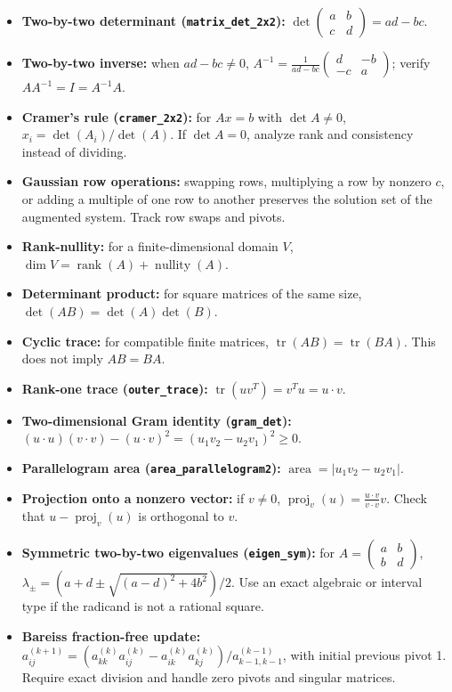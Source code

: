 \documentclass[
  10pt,
]{article}
\providecommand{\tightlist}{%
  \setlength{\itemsep}{0pt}\setlength{\parskip}{0pt}}
\begin{document}
\begin{itemize}
\tightlist
\item
  \textbf{Two-by-two determinant (\texttt{matrix\_det\_2x2}):}
  \(\det\begin{pmatrix}a&b\\c&d\end{pmatrix}=ad-bc\).
\item
  \textbf{Two-by-two inverse:} when \(ad-bc\ne0\),
  \(A^{-1}=\frac1{ad-bc}\begin{pmatrix}d&-b\\-c&a\end{pmatrix}\); verify
  \(AA^{-1}=I=A^{-1}A\).
\item
  \textbf{Cramer's rule (\texttt{cramer\_2x2}):} for \(Ax=b\) with
  \(\det A\ne0\), \(x_i=\det(A_i)/\det(A)\). If \(\det A=0\), analyze
  rank and consistency instead of dividing.
\item
  \textbf{Gaussian row operations:} swapping rows, multiplying a row by
  nonzero \(c\), or adding a multiple of one row to another preserves
  the solution set of the augmented system. Track row swaps and pivots.
\item
  \textbf{Rank-nullity:} for a finite-dimensional domain \(V\),
  \(\dim V=\operatorname{rank}(A)+\operatorname{nullity}(A)\).
\item
  \textbf{Determinant product:} for square matrices of the same size,
  \(\det(AB)=\det(A)\det(B)\).
\item
  \textbf{Cyclic trace:} for compatible finite matrices,
  \(\operatorname{tr}(AB)=\operatorname{tr}(BA)\). This does not imply
  \(AB=BA\).
\item
  \textbf{Rank-one trace (\texttt{outer\_trace}):}
  \(\operatorname{tr}(uv^T)=v^Tu=u\cdot v\).
\item
  \textbf{Two-dimensional Gram identity (\texttt{gram\_det}):}
  \((u\cdot u)(v\cdot v)-(u\cdot v)^2=(u_1v_2-u_2v_1)^2\ge0\).
\item
  \textbf{Parallelogram area (\texttt{area\_parallelogram2}):}
  \(\operatorname{area}=|u_1v_2-u_2v_1|\).
\item
  \textbf{Projection onto a nonzero vector:} if \(v\ne0\),
  \(\operatorname{proj}_v(u)=\frac{u\cdot v}{v\cdot v}v\). Check that
  \(u-\operatorname{proj}_v(u)\) is orthogonal to \(v\).
\item
  \textbf{Symmetric two-by-two eigenvalues (\texttt{eigen\_sym}):} for
  \(A=\begin{pmatrix}a&b\\b&d\end{pmatrix}\),
  \(\lambda_{\pm}=(a+d\pm\sqrt{(a-d)^2+4b^2})/2\). Use an exact
  algebraic or interval type if the radicand is not a rational square.
\item
  \textbf{Bareiss fraction-free update:}
  \(a_{ij}^{(k+1)}=(a_{kk}^{(k)}a_{ij}^{(k)}-a_{ik}^{(k)}a_{kj}^{(k)})/a_{k-1,k-1}^{(k-1)}\),
  with initial previous pivot 1. Require exact division and handle zero
  pivots and singular matrices.
\end{itemize}
\end{document}
